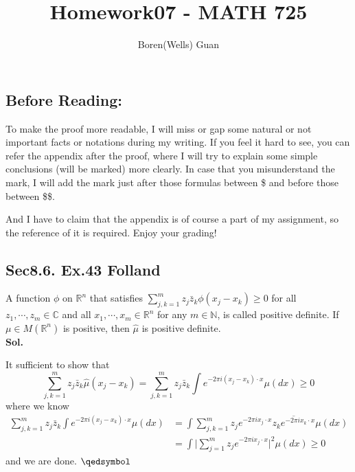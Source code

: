 \documentclass[lang=en,11pt,a4paper,citestyle =authoryear]{elegantpaper}
\title{Homework07 - MATH 725}
\author{Boren(Wells) Guan}
\newcommand{\prvd}{$\hfill \qedsymbol$}
\newcommand{\R}{\mathbb{R}}
\newcommand{\N}{\mathbb{N}}
\newcommand{\C}{\mathbb{C}}
\begin{document}
\maketitle

\subsection*{Before Reading:}\par
To make the proof more readable, I will miss or gap some natural or not important facts or notations during my writing. If you feel it hard to see, you can refer the appendix after the proof, where I will try to explain some simple conclusions (will be marked) more clearly. In case that you misunderstand the mark, I will add the mark just after those formulas between \$ and before those between \$\$.\par
And I have to claim that the appendix is of course a part of my assignment, so the reference of it is required. Enjoy your grading!

\subsection*{Sec8.6. Ex.43 Folland} 
A function $\phi$ on $\R^n$ that satisfies $\sum\limits_{j,k = 1}^m z_j\bar{z}_k\phi(x_j-x_k) \geq 0$ for all $z_1,\cdots,z_m\in\C$ and all $x_1,\cdots,x_m\in\R^n$ for any $m\in\N$, is called positive definite. If $\mu\in M(\R^n)$ is positive, then $\hat{\mu}$ is positive definite. 
\vspace{0.5em}\\
\textbf{Sol.} \par
It sufficient to show that
\[
\sum\limits_{j,k = 1}^m z_j\bar{z}_k\hat{\mu}(x_j-x_k) = \sum\limits_{j,k = 1}^m z_j\bar{z}_k\int e^{-2\pi i (x_j-x_k)\cdot x}\mu(dx) \geq 0
\]
where we know
\[
\begin{aligned}
\sum\limits_{j,k = 1}^m z_j\bar{z}_k\int e^{-2\pi i (x_j-x_k)\cdot x}\mu(dx) &= \int \sum\limits_{j,k=1}^m z_je^{-2\pi i x_j\cdot x}\overline{z_ke^{-2\pi i x_k\cdot x}}\mu(dx)\\
& = \int \Big|\sum\limits_{j=1}^m z_je^{-2\pi i x_j\cdot x}\Big|^2 \mu(dx) \geq 0
\end{aligned}
\]
and we are done.
\prvd
\end{document}
